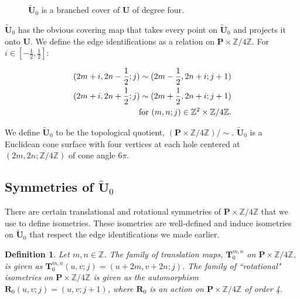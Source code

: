 \documentclass[]{article}
\newtheorem{Def}{Definition}[section]
\begin{document}
\begin{figure}[H]
\centering

\label{fig:utilda0}
\caption{$\tilde{\mathbf{U}}_0$ is a branched cover of $\mathbf{U}$ of degree four.}
\end{figure}

$\tilde{\mathbf{U}}_0$ has the obvious covering map that takes every point on $\tilde{\mathbf{U}}_0$ and projects it onto $\mathbf{U}$. We define the edge identifications as a relation on $\mathbf{P}\times\mathbb{Z}/4\mathbb{Z}$. For $i\in[-\frac{1}{2},\frac{1}{2}]$:



\begin{equation}
\begin{split}
(2m+i, 2n-\frac{1}{2};j)\sim(2m-\frac{1}{2},2n+i;j+1)\\
(2m+i, 2n+\frac{1}{2};j)\sim(2m+\frac{1}{2},2n+i;j+1)\\
\vspace{0.2in}\text{for } (m,n;j) \in \mathbb{Z}^{2}\times\mathbb{Z}/4\mathbb{Z}.
\label{eq:rel2}
\end{split}
\end{equation}

We define $\tilde{\mathbf{U}}_0$ to be the topological quotient, $(\mathbf{P}\times\mathbb{Z}/4\mathbb{Z})/\sim$. $\tilde{\mathbf{U}}_0$ is a Euclidean cone surface with four vertices at each hole centered at $(2m,2n;\mathbb{Z}/4\mathbb{Z})$ of cone angle $6\pi$.

\subsection{Symmetries of $\tilde{\mathbf{U}}_0$}
There are certain translational and rotational symmetries of $\mathbf{P}\times\mathbb{Z}/4\mathbb{Z}$ that we use to define isometries. These isometries are well-defined and induce isometries on $\tilde{\mathbf{U}}_0$ that respect the edge identifications we made earlier.

\begin{Def}Let $m,n\in\mathbb{Z}$. The {family of translation maps}, $\mathbf{T}^{m,n}_{0}$ on $\mathbf{P}\times\mathbb{Z}/4\mathbb{Z}$, is given as $\mathbf{T}^{m,n}_{0}(u,v;j)=(u+2m,v+2n;j)$.\newline
The {family of ``rotational" isometries} on $\mathbf{P}\times\mathbb{Z}/4\mathbb{Z}$ is given as the automorphism $\mathbf{R}_0(u,v;j)=(u,v;j+1)$, where $\mathbf{R}_0$ is an action on $\mathbf{P}\times\mathbb{Z}/4\mathbb{Z}$ of order 4.
\end{Def}
\end{document}
